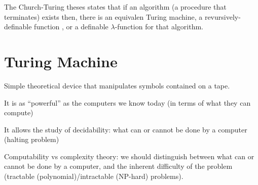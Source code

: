 \noindent
The Church-Turing theses states that if an algorithm (a procedure that terminates)
exists then, there is an equivalen Turing machine, a revursively-definable function
, or a definable $\lambda$-function for that algorithm.

\section{Turing Machine}
\label{sec:Turing Machine}
Simple theoretical device that manipulates symbols contained on a tape.\\
\smallskip

\noindent
It is as ``powerful'' as the computers we know today (in terms of what they
can compute)\\
\smallskip

\noindent
It allows the study of {\color{red} decidability}: what can or cannot
be done by a computer (halting problem)\\
\smallskip

\noindent
Computability vs complexity theory: we should distinguish between what
can or cannot be done by a computer, and the inherent difficulty of the
problem (tractable (polynomial)/intractable (NP-hard) problems).

